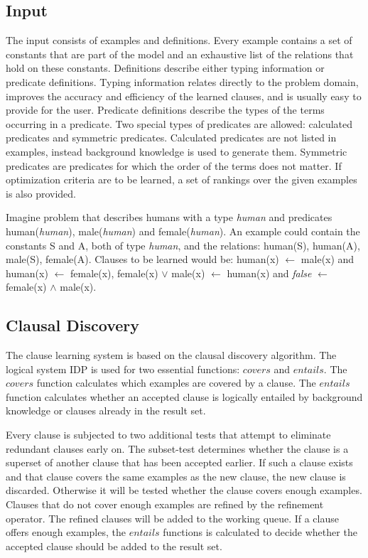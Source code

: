 \documentclass{llncs}
\begin{document}
\subsection{Input}
The input consists of examples and definitions.
Every example contains a set of constants that are part of the model and an exhaustive list of the relations that hold on these constants.
Definitions describe either typing information or predicate definitions.
Typing information relates directly to the problem domain, improves the accuracy and efficiency of the learned clauses, and is usually easy to provide for the user.
Predicate definitions describe the types of the terms occurring in a predicate.
Two special types of predicates are allowed: calculated predicates and symmetric predicates.
Calculated predicates are not listed in examples, instead background knowledge is used to generate them.
Symmetric predicates are predicates for which the order of the terms does not matter.
If optimization criteria are to be learned, a set of rankings over the given examples is also provided.

\begin{example}
  Imagine problem that describes humans with a type \textit{human} and predicates human(\textit{human}), male(\textit{human}) and female(\textit{human}).
  An example could contain the constants S and A, both of type \textit{human}, and the relations: human(S), human(A), male(S), female(A).
  Clauses to be learned would be: human(x) $\leftarrow$ male(x) and human(x) $\leftarrow$ female(x),  female(x) $\lor$ male(x) $\leftarrow$ human(x) and \textit{false} $\leftarrow$ female(x) $\land$ male(x).
\end{example}
\subsection{Clausal Discovery}
The clause learning system is based on the clausal discovery algorithm.
The logical system IDP is used for two essential functions: $\mathit{covers}$ and $\mathit{entails}$.
The $\mathit{covers}$ function calculates which examples are covered by a clause.
The $\mathit{entails}$ function calculates whether an accepted clause is logically entailed by background knowledge or clauses already in the result set.

Every clause is subjected to two additional tests that attempt to eliminate redundant clauses early on.
The subset-test determines whether the clause is a superset of another clause that has been accepted earlier.
If such a clause exists and that clause covers the same examples as the new clause, the new clause is discarded.
Otherwise it will be tested whether the clause covers enough examples.
Clauses that do not cover enough examples are refined by the refinement operator.
The refined clauses will be added to the working queue.
If a clause offers enough examples, the $\mathit{entails}$ functions is calculated to decide whether the accepted clause should be added to the result set.
\end{document}
